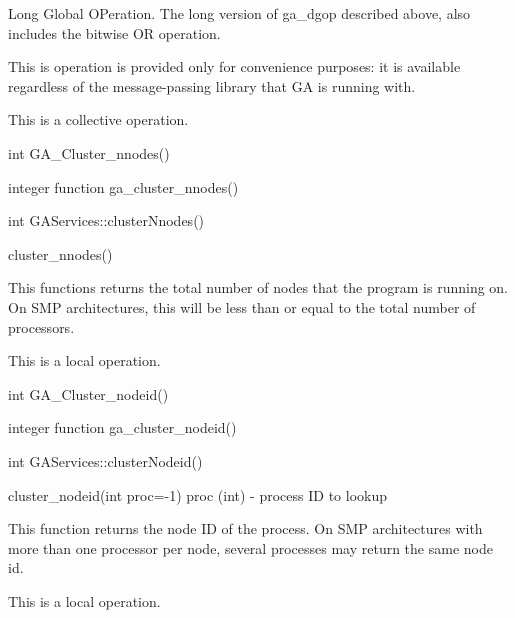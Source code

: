 \documentclass[12pt]{article}
\begin{document}
\begin{desc}

Long Global OPeration. The long version of ga_dgop described above, 
also includes the bitwise OR operation.

This is operation is provided only for convenience purposes: it is 
available regardless of the message-passing library that GA is running with.

This is a collective operation.
\end{desc}


\begin{capi}
int GA_Cluster_nnodes()
\end{capi}

\begin{fapi}
integer function ga_cluster_nnodes()
\end{fapi}

\begin{cxxapi}
int GAServices::clusterNnodes()
\end{cxxapi}

\begin{pyapi}
cluster_nnodes() 
\end{pyapi}

\begin{desc}


This functions returns the total number of nodes that the program is running 
on. On SMP architectures, this will be less than or equal to the total number 
of processors.

This is a  local operation.
\end{desc}


\begin{capi}
int GA_Cluster_nodeid()
\end{capi}

\begin{fapi}
integer function ga_cluster_nodeid()
\end{fapi}

\begin{cxxapi}
int GAServices::clusterNodeid()
\end{cxxapi}

\begin{pyapi}
cluster_nodeid(int proc=-1)  
   proc (int)    - process ID to lookup
\end{pyapi}

\begin{desc}

This function returns the node ID of the process. On SMP architectures with more 
than one processor per node, several processes may return the same node id.

This is a  local operation.
\end{desc}
\end{document}

